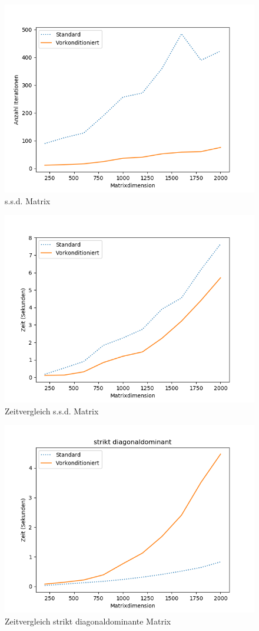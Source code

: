 \begin{figure}
    \centering
    \includegraphics[width=\linewidth]{Aufgabe_1/f.png}
    \caption{s.s.d. Matrix}
\end{figure}

\begin{figure}
    \centering
    \includegraphics[width=\linewidth]{Aufgabe_1/vcg.png}
    \caption{Zeitvergleich s.s.d. Matrix}
\end{figure}

\begin{figure}
    \centering
    \includegraphics[width=\linewidth]{Aufgabe_1/vcg_strikt.png}
    \caption{Zeitvergleich strikt diagonaldominante Matrix}
\end{figure}
